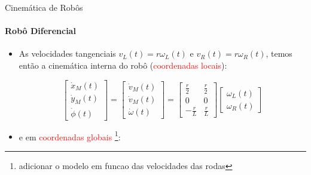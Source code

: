 \documentclass{beamer}
\begin{document}
\begin{frame}{Cinemática de Robôs}
    \framesubtitle{Robô Diferencial}
    \begin{itemize}
        \item As velocidades tangenciais $v_L(t)=r\omega_L(t)$ e $v_R(t)=r\omega_R(t)$, temos então a cinemática interna do robô (\textcolor{red}{coordenadas locais}):

              \begin{equation*}
                  \boxed{
                      \begin{bmatrix}
                          \dot{x}_M(t) \\
                          \dot{y}_M(t) \\
                          \dot{\phi}(t)
                      \end{bmatrix}
                      =
                      \begin{bmatrix}
                          \dot{v}_M(t) \\
                          \dot{v}_M(t) \\
                          \dot{\omega}(t)
                      \end{bmatrix}
                      =
                      \begin{bmatrix}
                          \frac{r}{2}  & \frac{r}{2} \\
                          0            & 0           \\
                          -\frac{r}{L} & \frac{r}{L}
                      \end{bmatrix}
                      \begin{bmatrix}
                          \omega_L(t) \\
                          \omega_R(t)
                      \end{bmatrix}}
              \end{equation*}

        \item e em \textcolor{red}{coordenadas globais}
              \footnote{adicionar o modelo em funcao das velocidades das rodas}:


\end{itemize}
\end{frame}
\end{document}
